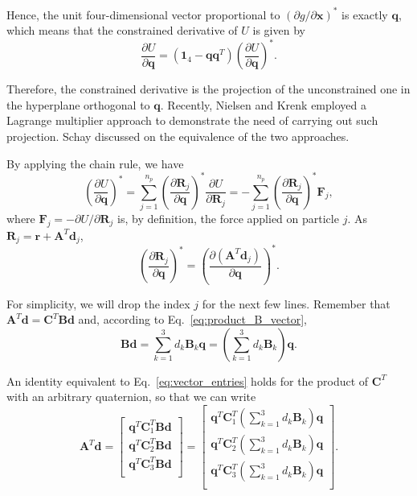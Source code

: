 \documentclass[aip,jcp,reprint,amsmath,amssymb]{revtex4-1}
\newcommand{\mt}[1]{\boldsymbol{\mathbf{#1}}}           %
\newcommand{\vt}[1]{\boldsymbol{\mathbf{#1}}}           %
\newcommand{\tr}[1]{#1^T}                               %
\newcommand{\diff}[2]{\dfrac{\partial #1}{\partial #2}} %
\begin{document}
Hence, the unit four-dimensional vector proportional to $(\partial g/\partial \vt x)^\ast$ is exactly $\vt q$, which means that the constrained derivative of $U$ is given by
\begin{equation}
\label{eq:diff_projection}
\diff{U}{\vt q} = (\mt 1_4 - {\vt q}\tr{\vt q})\left( \diff{U}{\vt q} \right)^\ast.
\end{equation}

Therefore, the constrained derivative is the projection of the unconstrained one in the hyperplane orthogonal to $\vt q$. Recently, Nielsen and Krenk\cite{Nielsen2012} employed a Lagrange multiplier approach to demonstrate the need of carrying out such projection. Schay\cite{Schay1995, Schay1998} discussed on the equivalence of the two approaches.

By applying the chain rule, we have
\[
\left( \diff{U}{\vt q} \right)^\ast = \sum_{j=1}^{n_p} \left( \diff{\vt R_j}{\vt q} \right)^\ast \diff{U}{\vt R_j} = - \sum_{j=1}^{n_p} \left( \diff{\vt R_j}{\vt q} \right)^\ast {\vt F_j},
\]
where $\vt F_j = -\partial U/\partial \vt R_j$ is, by definition, the force applied on particle $j$. As $\vt R_j = \vt r + \tr{\mt A}\vt d_j$,
\[
\left( \diff{\vt R_j}{\vt q} \right)^\ast = \left( \diff{(\tr{\mt A}\vt d_j)}{\vt q} \right)^\ast.
\]

For simplicity, we will drop the index $j$ for the next few lines. Remember that $\tr{\mt A}\vt d = \tr{\mt C} \mt B\vt d$ and, according to Eq.~\ref{eq:product_B_vector},
\[
\mt B \vt d = \sum_{k=1}^3 d_k \mt B_k \vt q = \left( \sum_{k=1}^3 d_k \mt B_k \right) \vt q.
\]

An identity equivalent to Eq.~\ref{eq:vector_entries} holds for the product of $\tr{\mt C}$ with an arbitrary quaternion, so that we can write
\[
\tr{\mt A}{\vt d} =
\left[\begin{array}{c}
\tr{\vt q}\tr{\mt C}_1 \mt B \vt d \\
\tr{\vt q}\tr{\mt C}_2 \mt B \vt d \\
\tr{\vt q}\tr{\mt C}_3 \mt B \vt d \\
\end{array}\right] = 
\left[\begin{array}{c}
\tr{\vt q} \tr{\mt C}_1 \left( \sum_{k=1}^3 d_k \mt B_k \right) \vt q \\
\tr{\vt q} \tr{\mt C}_2 \left( \sum_{k=1}^3 d_k \mt B_k \right) \vt q \\
\tr{\vt q} \tr{\mt C}_3 \left( \sum_{k=1}^3 d_k \mt B_k \right) \vt q \\
\end{array}\right].
\]
\end{document}

